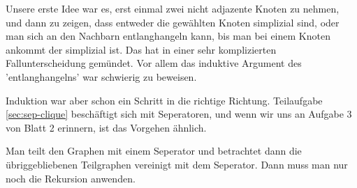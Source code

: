 \how

Unsere erste Idee war es, erst einmal zwei nicht adjazente Knoten zu nehmen, und dann zu zeigen, dass entweder die gewählten Knoten simplizial sind, oder man sich an den Nachbarn entlanghangeln kann, bis man bei einem Knoten ankommt der simplizial ist.
Das hat in einer sehr komplizierten Fallunterscheidung gemündet. Vor allem das induktive Argument des 'entlanghangelns' war schwierig zu beweisen.

Induktion war aber schon ein Schritt in die richtige Richtung. Teilaufgabe \ref{sec:sep-clique} beschäftigt sich mit Seperatoren, und wenn wir uns an Aufgabe 3 von Blatt 2 erinnern, ist das Vorgehen ähnlich.

Man teilt den Graphen mit einem Seperator und betrachtet dann die übriggebliebenen Teilgraphen vereinigt mit dem Seperator.
Dann muss man nur noch die Rekursion anwenden.



